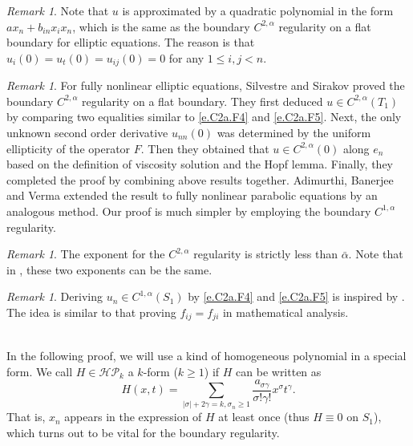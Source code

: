 \documentclass[preprint,12pt]{elsarticle}
\theoremstyle{definition}
\theoremstyle{remark}
\newtheorem{remark}[theorem]{Remark}
\numberwithin{equation}{section}
\begin{document}
\begin{remark}\label{re.C2a.F1}
Note that $u$ is approximated by a quadratic polynomial in the form $ax_n+b_{in}x_ix_n$, which is the same as the boundary $C^{2,\alpha}$ regularity on a flat boundary for elliptic equations. The reason is that $u_i(0)=u_t(0)=u_{ij}(0)=0$ for any $1\leq i,j<n$.
\end{remark}

\begin{remark}\label{re.C2a.F2}
For fully nonlinear elliptic equations, Silvestre and Sirakov \cite[Lemma 4.1]{MR3246039} proved the boundary $C^{2,\alpha}$ regularity on a flat boundary. They first deduced $u\in C^{2,\alpha}(T_1)$ by comparing two equalities similar to \cref{e.C2a.F4} and \cref{e.C2a.F5}. Next, the only unknown second order derivative $u_{nn}(0)$ was determined by the uniform ellipticity of the operator $F$. Then they obtained that $u\in C^{2,\alpha}(0)$ along $e_n$ based on the definition of viscosity solution and the Hopf lemma. Finally, they completed the proof by combining above results together. Adimurthi, Banerjee and Verma \cite[Lemma 3.1]{MR4073515} extended the result to fully nonlinear parabolic equations by an analogous method. Our proof is much simpler by employing the boundary $C^{1,\alpha}$ regularity.
\end{remark}

\begin{remark}\label{re.C2a.F4}
The exponent for the $C^{2,\alpha}$ regularity is strictly less than $\bar{\alpha}$. Note that in \cite{MR3246039}, these two exponents can be the same.
\end{remark}

\begin{remark}\label{re3.1}
Deriving $u_n\in C^{1,\alpha}(S_1)$ by \cref{e.C2a.F4} and \cref{e.C2a.F5} is inspired by \cite[Lemma 4.1]{MR3246039}. The idea is similar to that proving $f_{ij}=f_{ji}$ in mathematical analysis.
\end{remark}
~\\

In the following proof, we will use a kind of homogeneous polynomial in a special form. We call $H\in \mathcal{HP}_k$ a $k$-form ($k\geq 1$) if $H$ can be written as
\begin{equation}\label{k.form}
H(x,t)=\sum_{|\sigma|+2\gamma=k,\sigma_n\geq 1}\frac{a_{\sigma\gamma}}{\sigma!\gamma!}x^{\sigma}t^{\gamma}.
\end{equation}
That is, $x_n$ appears in the expression of $H$ at least once (thus $H\equiv 0$ on $S_1$), which turns out to be vital for the boundary regularity.~\\
\end{document}
